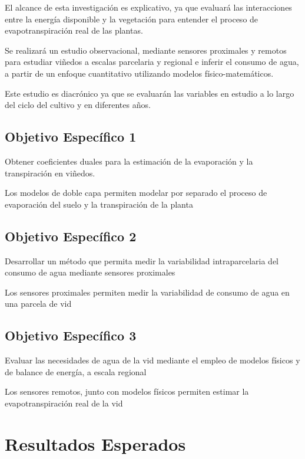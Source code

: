 \documentclass[]{article}
\begin{document}
El alcance de esta investigación es explicativo,  ya que evaluará las interacciones entre la energía  disponible  y la vegetación para entender el proceso de evapotranspiración real de las plantas.

Se realizará un estudio observacional, mediante sensores proximales y remotos para estudiar viñedos a escalas parcelaria y regional e inferir el consumo de agua, a partir de un enfoque cuantitativo utilizando modelos físico-matemáticos.

Este estudio es diacrónico ya que se evaluarán las variables en estudio a lo largo del ciclo del cultivo y en diferentes años.


\subsection{Objetivo Específico 1}
Obtener coeficientes duales para la estimación de la evaporación y la transpiración en viñedos.



Los modelos de doble capa permiten modelar por separado el proceso de evaporación del suelo y la transpiración de la planta

\subsection{Objetivo Específico 2}
Desarrollar un método que permita medir la variabilidad intraparcelaria del consumo de agua mediante sensores proximales

Los sensores proximales permiten medir la variabilidad de consumo de agua en una parcela de vid

\subsection{Objetivo Específico 3}
Evaluar las necesidades de agua de la vid mediante el empleo de modelos físicos y de balance de energía, a escala regional

Los sensores remotos, junto con modelos físicos permiten estimar la evapotranspiración real de la vid

\section{Resultados Esperados}









\end{document}
